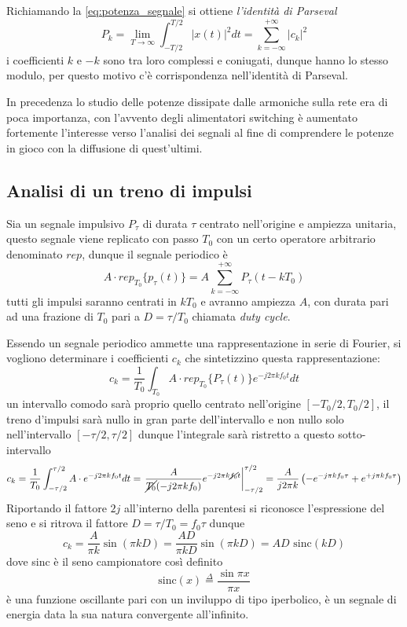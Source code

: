 Richiamando la \ref{eq:potenza_segnale}
si ottiene \textit{l'identità di Parseval}
$$
P_k = \lim_{T\to\infty} \int_{-T/2}^{T/2} |x(t)|^2 dt =
\sum_{k=-\infty}^{+\infty} |c_k|^2
$$
i coefficienti $k$ e $-k$ sono tra loro complessi e
coniugati, dunque hanno lo stesso modulo, per questo motivo c'è corrispondenza
nell'identità di Parseval.

In precedenza lo studio delle potenze dissipate dalle armoniche sulla rete era
di poca importanza, con l'avvento degli alimentatori switching è aumentato
fortemente l'interesse verso l'analisi dei segnali al fine di comprendere le
potenze in gioco con la diffusione di quest'ultimi.


\subsection{Analisi di un treno di impulsi}
Sia un segnale impulsivo $P_\tau$ di durata $\tau$ centrato nell'origine e
ampiezza unitaria, questo segnale viene replicato con passo $T_0$ con un certo
operatore arbitrario denominato $rep$, dunque il segnale periodico è
$$
A\cdot rep_{T_0} \{p_\tau(t) \} = A\sum_{k=-\infty}^{+\infty} P_\tau(t-kT_0)
$$
 tutti gli impulsi saranno centrati in $kT_0$ e avranno ampiezza $A$, con
durata pari ad una frazione di $T_0$ pari a $D = \tau/T_0$ chiamata
\textit{duty cycle}.

Essendo un segnale periodico ammette una rappresentazione in serie di Fourier,
si vogliono determinare i coefficienti $c_k$ che sintetizzino questa
rappresentazione:
$$
c_k = \frac{1}{T_0}\int_{T_0} A\cdot rep_{T_0}\{P_\tau(t)\}e^{-j2\pi k f_0 t} dt
$$
un intervallo comodo sarà proprio quello centrato nell'origine $[-T_0/2,
T_0/2]$, il treno d'impulsi sarà nullo in gran parte dell'intervallo e non
nullo solo nell'intervallo $[-\tau/2,\tau/2]$ dunque l'integrale sarà ristretto
a questo sotto-intervallo
$$
c_k = \frac{1}{T_0}\int_{-\tau/2}^{\tau/2} A\cdot e^{-j2\pi k f_0 t}dt =
\left.\frac{A}{\cancel{T_0}  (-j2\pi kf_0)} e^{-j 2\pi k\cancel{f_0}t}
\right|_{-\tau/2}^{\tau/2} = \frac{A}{j2\pi k } \left( -e^{-j\pi kf_0 \tau} +
e^{+j\pi kf_0 \tau}
\right)
$$
Riportando il fattore $2j$ all'interno della parentesi si riconosce
l'espressione del seno e si ritrova il fattore $D = \tau/T_0 = f_0\tau$
dunque
$$
c_k = \frac{A}{\pi k} \sin(\pi k D) = \frac{AD}{\pi kD} \sin(\pi k D) =  AD
\text{ sinc}(kD)
$$
dove sinc è il seno campionatore così definito
$$
\text{sinc}(x) \stackrel{\Delta}{=} \frac{\sin{\pi x}}{\pi x}
$$
è una funzione oscillante pari con un inviluppo di tipo iperbolico,
è un segnale di energia data la sua natura convergente all'infinito.


